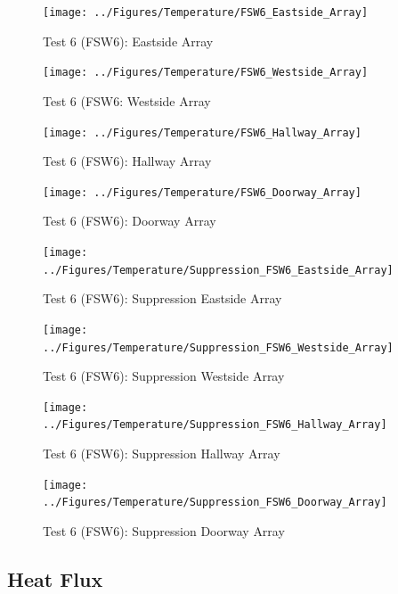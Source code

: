 \documentclass[12pt,oneside]{book}
\begin{document}
\begin{figure}[!ht]
	\texttt{[image: ../Figures/Temperature/FSW6\_Eastside\_Array]}
	\caption{Test 6 (FSW6): Eastside Array}
	\label{fig:Test_6_Eastside_Array}
\end{figure}

\begin{figure}[!ht]
	\texttt{[image: ../Figures/Temperature/FSW6\_Westside\_Array]}
	\caption{Test 6 (FSW6: Westside Array}
	\label{fig:Test_6_Westside_Array}
\end{figure}

\begin{figure}[!ht]
	\texttt{[image: ../Figures/Temperature/FSW6\_Hallway\_Array]}
	\caption{Test 6 (FSW6): Hallway Array}
	\label{fig:Test_6_Hallway_Array}
\end{figure}

\begin{figure}[!ht]
	\texttt{[image: ../Figures/Temperature/FSW6\_Doorway\_Array]}
	\caption{Test 6 (FSW6): Doorway Array}
	\label{fig:Test_6_Doorway_Array}
\end{figure}

\begin{figure}[!ht]
	\texttt{[image: ../Figures/Temperature/Suppression\_FSW6\_Eastside\_Array]}
	\caption{Test 6 (FSW6): Suppression Eastside Array}
	\label{fig:Test_6_Suppression_Eastside_Array}
\end{figure}

\begin{figure}[!ht]
	\texttt{[image: ../Figures/Temperature/Suppression\_FSW6\_Westside\_Array]}
	\caption{Test 6 (FSW6): Suppression Westside Array}
	\label{fig:Test_6_Suppression_Westside_Array}
\end{figure}

\begin{figure}[!ht]
	\texttt{[image: ../Figures/Temperature/Suppression\_FSW6\_Hallway\_Array]}
	\caption{Test 6 (FSW6): Suppression Hallway Array}
	\label{fig:Test_6_Suppression_Hallway_Array}
\end{figure}

\begin{figure}[!ht]
	\texttt{[image: ../Figures/Temperature/Suppression\_FSW6\_Doorway\_Array]}
	\caption{Test 6 (FSW6): Suppression Doorway Array}
	\label{fig:Test_6_Suppression_Doorway_Array}
\end{figure}

\subsection{Heat Flux}
\label{subsec:Heat_Flux}
\end{document}
